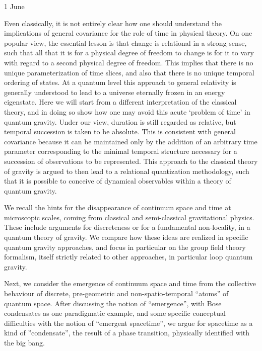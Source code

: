 \documentclass{conference}
\begin{document}
\begin{Day}{1 June}

  {Even classically, it is not entirely clear how one should understand the implications of general covariance for the role of time in physical theory. On one popular view, the essential lesson is that change is relational in a strong sense, such that all that it is for a physical degree of freedom to change is for it to vary with regard to a second physical degree of freedom. This implies that there is no unique parameterization of time slices, and also that there is no unique temporal ordering of states.  At a quantum level this approach to general relativity is generally understood to lead to a universe eternally frozen in an energy eigenstate. Here we will start from a different interpretation of the classical theory, and in doing so show how one may avoid this acute `problem of time' in quantum gravity. Under our view, duration is still regarded as relative, but temporal succession is taken to be absolute. This is consistent with general covariance because it can be maintained only by the addition of an arbitrary time parameter corresponding to the minimal temporal structure necessary for a succession of observations to be represented. This approach to the classical theory of gravity is argued to then lead to a relational quantization methodology, such that it is possible to conceive of dynamical observables within a theory of quantum gravity.}

  {We recall the hints for the disappearance of continuum space and time at microscopic scales, coming from classical and semi-classical gravitational physics. These include arguments for discreteness or for a fundamental non-locality, in a quantum theory of gravity. We compare how these ideas are realized in specific quantum gravity approaches, and focus in particular on the group field theory formalism, itself strictly related to other approaches, in particular loop quantum gravity.

Next, we consider the emergence of continuum space and time from the collective behaviour of discrete, pre-geometric and non-spatio-temporal “atoms” of quantum space. After discussing the notion of “emergence”, with Bose condensates as one paradigmatic example, and some specific conceptual difficulties with the notion of “emergent spacetime”, we argue for spacetime as a kind of ”condensate”, the result of a phase transition, physically identified with the big bang.

}
\end{Day}
\end{document}
